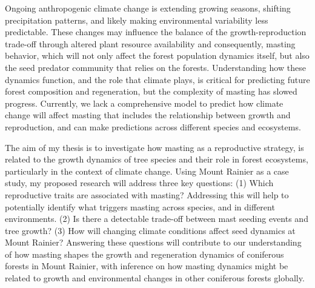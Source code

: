 \documentclass[11pt,letter]{article}
\begin{document}
Ongoing anthropogenic climate change is extending growing seasons, shifting precipitation patterns, and likely making environmental variability less predictable. These changes may influence the balance of the growth-reproduction trade-off through altered plant resource availability and consequently, masting behavior, which will not only affect the forest population dynamics itself, but also the seed predator community that relies on the forests. Understanding how these dynamics function, and the role that climate plays, is critical for predicting future forest composition and regeneration, but the complexity of masting has slowed progress. Currently, we lack a comprehensive model to predict how climate change will affect masting that includes the relationship between growth and reproduction, and can make predictions across different species and ecosystems.\par

The aim of my thesis is to investigate how masting as a reproductive strategy, is related to the growth dynamics of tree species and their role in forest ecosystems, particularly in the context of climate change. Using Mount Rainier as a case study, my proposed research will address three key questions: (1) Which reproductive traits are associated with masting? Addressing this will help to potentially identify what triggers masting across species, and in different environments. (2) Is there a detectable trade-off between mast seeding events and tree growth? (3) How will changing climate conditions affect seed dynamics at Mount Rainier? Answering these questions will contribute to our understanding of how masting shapes the growth and regeneration dynamics of coniferous forests in Mount Rainier, with inference on how masting dynamics might be related to growth and environmental changes in other coniferous forests globally.\par
\end{document}
